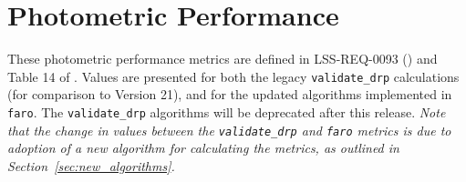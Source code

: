 \documentclass[DM, lsstdraft, toc]{lsstdoc}
\begin{document}



\section{Photometric Performance}\label{photometric-performance}

These photometric performance
metrics are defined in LSS-REQ-0093 () and Table 14 of . Values are presented for both the legacy \texttt{validate\_drp} calculations (for comparison to Version 21), and for the updated algorithms implemented in \texttt{faro}. The \texttt{validate\_drp} algorithms will be deprecated after this release. \textit{Note that the change in values between the \texttt{validate\_drp} and \texttt{faro} metrics is due to adoption of a new algorithm for calculating the metrics, as outlined in Section~\ref{sec:new_algorithms}.}
\end{document}
